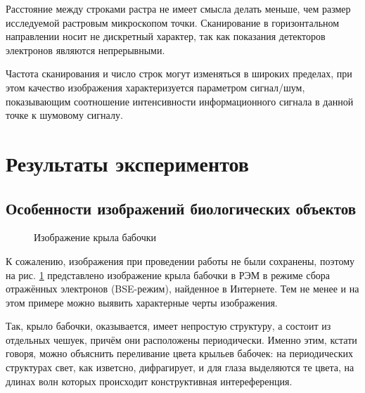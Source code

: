 \documentclass[a4paper,12pt]{article}	%
\begin{document}
\medskip
        
\noindent Расстояние между строками растра не имеет смысла делать меньше, чем размер исследуемой растровым микроскопом точки. Сканирование в горизонтальном направлении носит не дискретный характер, так как показания детекторов электронов являются непрерывными.

\medskip

\noindent Частота сканирования и число строк могут изменяться в широких пределах, при этом качество изображения характеризуется параметром сигнал/шум, показывающим соотношение интенсивности информационного сигнала в данной точке к шумовому сигналу.
	
\section{Результаты экспериментов}

    \subsection{Особенности изображений биологических объектов}

        \begin{figure}
    	\caption{Изображение крыла бабочки}
    	\label{бабочка}
	\end{figure}

\noindent К сожалению, изображения при проведении работы не были сохранены, поэтому на рис. \ref{бабочка} представлено изображение крыла бабочки в РЭМ в режиме сбора отражённых электронов (BSE-режим), найденное в Интернете. Тем не менее и на этом примере можно выявить характерные черты изображения.

\medskip

\noindent Так, крыло бабочки, оказывается, имеет непростую структуру, а состоит из отдельных чешуек, причём они расположены периодически. Именно этим, кстати говоря, можно объяснить переливание цвета крыльев бабочек: на периодических структурах свет, как изветсно, дифрагирует, и для глаза выделяются те цвета, на длинах волн которых происходит конструктивная интереференция.
\end{document}
